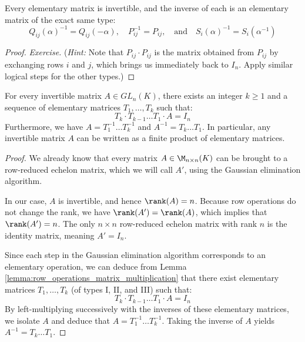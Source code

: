 \begin{lemma}
\label{lemma:elementary_matrix_inverses}
Every elementary matrix is invertible, and the inverse of each is an elementary matrix of the exact same type:
\begin{equation*}
    Q_{ij}(\alpha)^{-1} = Q_{ij}(-\alpha), \quad P_{ij}^{-1} = P_{ij}, \quad \text{and} \quad S_i(\alpha)^{-1} = S_i(\alpha^{-1})
\end{equation*}
\end{lemma}

\begin{proof}
\textit{Exercise.} (\textit{Hint:} Note that $P_{ij} \cdot P_{ij}$ is the matrix obtained from $P_{ij}$ by exchanging rows $i$ and $j$, which brings us immediately back to $I_n$. Apply similar logical steps for the other types.)
\end{proof}

\begin{theorem}
\label{thm:elementary_matrix_decomposition}
For every invertible matrix $A \in GL_n(K)$, there exists an integer $k \ge 1$ and a sequence of elementary matrices $T_1, \dots, T_k$ such that:
\begin{equation*}
    T_k \cdot T_{k-1} \dots T_1 \cdot A = I_n
\end{equation*}
Furthermore, we have $A = T_1^{-1} \dots T_k^{-1}$ and $A^{-1} = T_k \dots T_1$. In particular, any invertible matrix $A$ can be written as a finite product of elementary matrices.
\end{theorem}

\begin{proof}
We already know that every matrix $A \in \M_{n \times n}(K)$ can be brought to a row-reduced echelon matrix, which we will call $A'$, using the Gaussian elimination algorithm. 

In our case, $A$ is invertible, and hence $\rank(A) = n$. Because row operations do not change the rank, we have $\rank(A') = \rank(A)$, which implies that $\rank(A') = n$. The only $n \times n$ row-reduced echelon matrix with rank $n$ is the identity matrix, meaning $A' = I_n$. 

Since each step in the Gaussian elimination algorithm corresponds to an elementary operation, we can deduce from Lemma \ref{lemma:row_operations_matrix_multiplication} that there exist elementary matrices $T_1, \dots, T_k$ (of types I, II, and III) such that:
\begin{equation*}
    T_k \cdot T_{k-1} \dots T_1 \cdot A = I_n
\end{equation*}
By left-multiplying successively with the inverses of these elementary matrices, we isolate $A$ and deduce that $A = T_1^{-1} \dots T_k^{-1}$. Taking the inverse of $A$ yields $A^{-1} = T_k \dots T_1$.
\end{proof}

